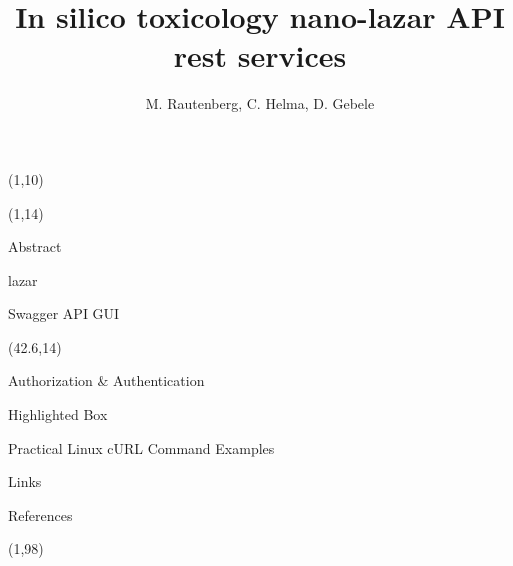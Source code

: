 \documentclass[final]{beamer}
\title{In silico toxicology nano-lazar API rest services}
\author{M. Rautenberg, C. Helma, D. Gebele}
\institute{\emph{in silico} toxicology gmbh, Basel, Switzerland}
\begin{document}
  \begin{frame}{}

    \begin{textblock}{80}(1,10)
        
    \end{textblock}

    \begin{textblock}{40.5}(1,14)
      \begin{block}{Abstract}
        \justifying
        
      \end{block}

      \begin{block}{lazar}
        \justifying
        
      \end{block}

      \begin{block}{Swagger API GUI}
        
      \end{block}

    \end{textblock}

    \begin{textblock}{40.5}(42.6,14)

      \begin{block}{Authorization \& Authentication}
        \justifying        
        
      \end{block}

      \begin{alertblock}{Highlighted Box}
        
      \end{alertblock}

      \begin{block}{Practical Linux cURL Command Examples}
        
      \end{block}

      \begin{exampleblock}{Links}
        
      \end{exampleblock}

      \begin{block}{References}
        \justifying
        \small
      \end{block}

    \end{textblock}

    \begin{textblock}{82.1}(1,98)
      
    \end{textblock}

  \end{frame}
\end{document}

